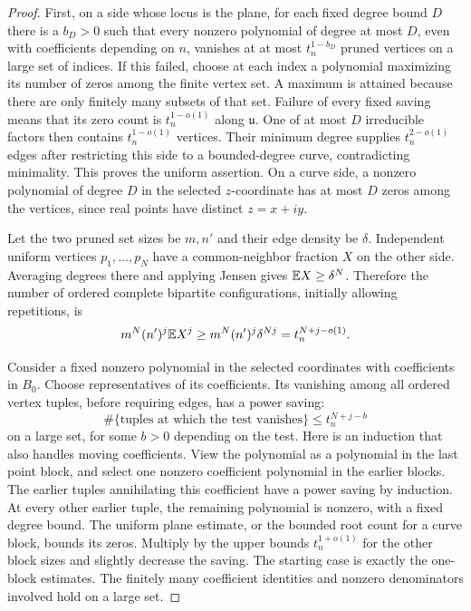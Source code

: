 \begin{proof}
First, on a side whose locus is the plane, for each fixed degree bound
\(D\) there is a \(b_D>0\) such that every nonzero polynomial of degree
at most \(D\), even with coefficients depending on \(n\), vanishes at
at most \(t_n^{1-b_D}\) pruned vertices on a large set of indices.
If this failed, choose at each index a polynomial maximizing its number
of zeros among the finite vertex set. A maximum is attained because
there are only finitely many subsets of that set. Failure of every
fixed saving means that its zero count is \(t_n^{1-o(1)}\) along
\(\mathfrak u\). One of at most \(D\) irreducible factors then contains
\(t_n^{1-o(1)}\) vertices. Their minimum degree supplies
\(t_n^{2-o(1)}\) edges after restricting this side to a bounded-degree
curve, contradicting minimality. This proves the uniform assertion.
On a curve side, a nonzero polynomial of degree \(D\) in the selected
\(z\)-coordinate has at most \(D\) zeros among the vertices, since real
points have distinct \(z=x+iy\).

Let the two pruned set sizes be \(m,n'\) and their edge density be
\(\delta\). Independent uniform vertices
\(p_1,\ldots,p_N\) have a common-neighbor fraction \(X\) on the other
side. Averaging degrees there and applying Jensen gives
\(\mathbb E X\ge\delta^N\). Therefore the number of ordered complete bipartite configurations,
initially allowing repetitions, is
\begin{equation}\label{alg:grid-count}
 m^N(n')^j\mathbb E X^j
 \ge m^N(n')^j\delta^{Nj}
 =t_n^{N+j-o(1)}.
\end{equation}

Consider a fixed nonzero polynomial in the selected coordinates with
coefficients in \(B_0\). Choose representatives of its coefficients.
Its vanishing among all ordered vertex tuples, before requiring edges,
has a power saving:
\begin{equation}\label{alg:test-count}
 \#\{\text{tuples at which the test vanishes}\}
       \le t_n^{N+j-b}
\end{equation}
on a large set, for some \(b>0\) depending on the test. Here is an
induction that also handles moving coefficients. View the polynomial
as a polynomial in the last point block, and select one nonzero
coefficient polynomial in the earlier blocks. The earlier tuples
annihilating this coefficient have a power saving by induction. At
every other earlier tuple, the remaining polynomial is nonzero, with a
fixed degree bound. The uniform plane estimate, or the bounded root
count for a curve block, bounds its zeros. Multiply by the upper
bounds \(t_n^{1+o(1)}\) for the other block sizes and slightly decrease
the saving. The starting case is exactly the one-block estimates.
The finitely many coefficient identities and nonzero denominators
involved hold on a large set.


\end{proof}
